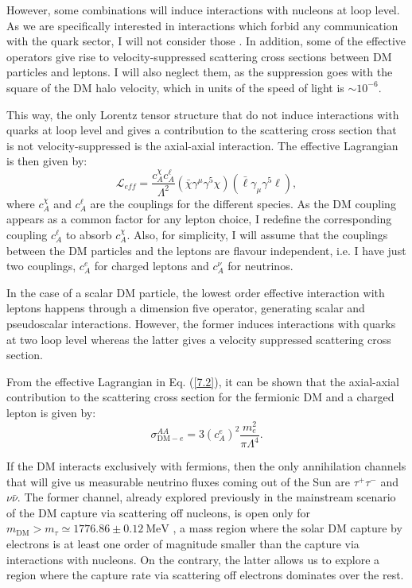 However, some combinations will induce interactions with nucleons at loop level. As we are specifically interested in interactions which forbid any communication with the quark sector, I will not consider those \cite{Kopp2009}. In addition, some of the effective operators give rise to velocity-suppressed scattering cross sections between DM particles and leptons. I will also neglect them, as the suppression goes with the square of the DM halo velocity, which in units of the speed of light is $\sim 10^{-6}$.

This way, the only Lorentz tensor structure that do not induce interactions with quarks at loop level and gives a contribution to the scattering cross section that is not velocity-suppressed is the axial-axial interaction. The effective Lagrangian is then given by:
\begin{equation}\label{7.2}
	\mathcal{L}_{eff} = \frac{c_{A}^{\chi} c_{A}^{\ell}}{\Lambda^{2}} \left(\bar{\chi} \gamma^{\mu}\gamma^{5} \chi\right)\left(\bar{\ell} \gamma_{\mu}\gamma^{5} \ell\right),
\end{equation}
where $c_{A}^{\chi}$ and $c_{A}^{\ell}$ are the couplings for the different species. As the DM coupling appears as a common factor for any lepton choice, I redefine the corresponding coupling $c_{A}^{\ell}$ to absorb $c_{A}^{\chi}$. Also, for simplicity, I will assume that the couplings between the DM particles and the leptons are flavour independent, i.e. I have just two couplings, $c_{A}^{e}$ for charged leptons and $c_{A}^{\nu}$ for neutrinos.

In the case of a scalar DM particle, the lowest order effective interaction with leptons happens through a dimension five operator, generating scalar and pseudoscalar interactions. However, the former induces interactions with quarks at two loop level whereas the latter gives a velocity suppressed scattering cross section.

From the effective Lagrangian in Eq. (\ref{7.2}), it can be shown that the axial-axial contribution to the scattering cross section for the fermionic DM and a charged lepton is given by:
\begin{equation}\label{7.3}
	\sigma_{\mathrm{DM}-e}^{AA} = 3 \left(c_{A}^{e}\right)^{2} \frac{m_{e}^{2}}{\pi \Lambda^{4}}.
\end{equation}

If the DM interacts exclusively with fermions, then the only annihilation channels that will give us measurable neutrino fluxes coming out of the Sun are $\tau^{+}\tau^{-}$ and $\nu\bar{\nu}$. The former channel, already explored previously in the mainstream scenario of the DM capture via scattering off nucleons, is open only for $m_{\mathrm{DM}} > m_{\tau} \simeq 1776.86 \pm 0.12 \ \mathrm{MeV}$ \cite{ParticleDataGroup2020}, a mass region where the solar DM capture by electrons is at least one order of magnitude smaller than the capture via interactions with nucleons. On the contrary, the latter allows us to explore a region where the capture rate via scattering off electrons dominates over the rest.


